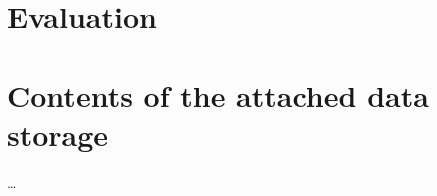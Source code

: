 \documentclass[english,zadani,odsaz]{fitthesis}
\begin{document}
\chapter{Evaluation}
\label{sec:orgd17bf8e}

\makeatletter
\def\@openbib@code{\addcontentsline{toc}{chapter}{Bibliography}}
\makeatother


\begin{flushleft}

\end{flushleft}
\iftwoside\cleardoublepage\fi

\appendix
\appendixpage
\iftwoside\cleardoublepage\fi

\startcontents[chapters]
\iftwoside\cleardoublepage\fi

\chapter{Contents of the attached data storage}
\label{sec:org01ce501}
\ldots{}
\end{document}
